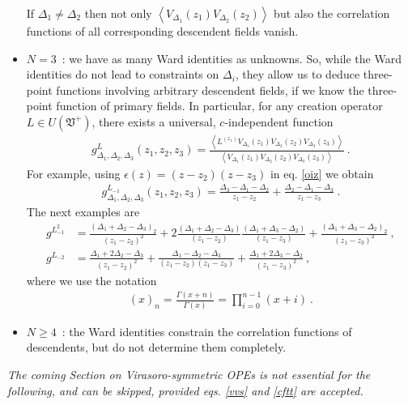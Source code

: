 \documentclass[12pt, a4paper, notitlepage, twoside]{report}
\numberwithin{equation}{section}
\theoremstyle{break}
\begin{document}
\begin{itemize}
If $\Delta_1\neq \Delta_2$ then not only $\left\langle V_{\Delta_1}(z_1)V_{\Delta_2}(z_2)\right\rangle$ but also the correlation functions of all corresponding descendent fields vanish. 
\item $\boxed{N=3}$\ : we have as many Ward identities as unknowns.
So, while the Ward identities do not lead to constraints on $\Delta_i$, they allow us to deduce three-point functions involving arbitrary descendent fields, if we know the three-point function of primary fields.
In particular, for any creation operator $L\in U(\mathfrak{V}^+)$, there exists a universal, $c$-independent function
\begin{align}
 g^{L}_{\Delta_1,\Delta_2,\Delta_3}(z_1,z_2,z_3) = \frac{\left\langle L^{(z_1)} V_{\Delta_1}(z_1)V_{\Delta_2}(z_2)V_{\Delta_3}(z_3)\right\rangle}{\left\langle V_{\Delta_1}(z_1)V_{\Delta_2}(z_2)V_{\Delta_3}(z_3)\right\rangle } \ .
\label{lzgz}
\end{align}
For example, using $\epsilon(z)=(z-z_2)(z-z_3)$ in eq. \eqref{oiz} we obtain 
\begin{align}
 g^{L_{-1}}_{\Delta_1,\Delta_2,\Delta_3}(z_1,z_2,z_3) = \frac{\Delta_3-\Delta_1-\Delta_2}{z_1-z_2} +\frac{\Delta_2-\Delta_1-\Delta_3}{z_1-z_3}\ .
\label{glp}
\end{align}
The next examples are 
\begin{align}
 g^{L_{-1}^2} &= \frac{(\Delta_1+\Delta_2-\Delta_3)_2}{(z_1-z_2)^2} + 2\frac{(\Delta_1+\Delta_2-\Delta_3)}{(z_1-z_2)}\frac{(\Delta_1+\Delta_3-\Delta_2)}{(z_1-z_3)} + \frac{(\Delta_1+\Delta_3-\Delta_2)_2}{(z_1-z_3)^2}\ ,
\label{gloo}
\\
 g^{L_{-2}} & = \frac{\Delta_1+2\Delta_2-\Delta_3}{(z_1-z_2)^2} +\frac{\Delta_1-\Delta_2-\Delta_3}{(z_1-z_2)(z_1-z_3)} + \frac{\Delta_1+2\Delta_3-\Delta_2}{(z_1-z_3)^2}\ ,
\label{glt}
\end{align}
where we use the notation
\begin{align}
 (x)_n = \frac{\Gamma(x+n)}{\Gamma(x)} = \prod_{i=0}^{n-1}(x+i)\ .
\label{xn}
\end{align}
\item $\boxed{N\geq 4}$\ : the Ward identities constrain the correlation functions of descendents, but do not determine them completely.
\end{itemize}

\vspace{2mm} 

\textit{The coming Section on Virasoro-symmetric OPEs is not essential for the following, and can be skipped, provided eqs. \eqref{vvs} and \eqref{cftt} are accepted.}
\end{document}
